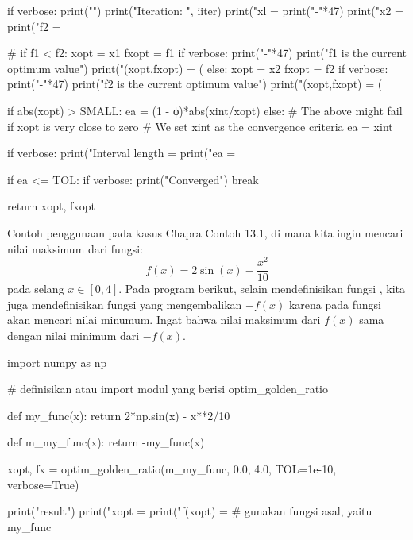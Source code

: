 \begin{pythoncode}
        if verbose:
            print("")
            print("Iteration: ", iiter)
            print("xl = %
            print("-"*47)
            print("x2 = %
            print("f2 = %

        #
        if f1 < f2:
            xopt = x1
            fxopt = f1
            if verbose:
                print("-"*47)
                print("f1 is the current optimum value")
                print("(xopt,fxopt) = (%
        else:
            xopt = x2
            fxopt = f2
            if verbose:
                print("-"*47)
                print("f2 is the current optimum value")
                print("(xopt,fxopt) = (%

        if abs(xopt) > SMALL:
            ea = (1 - ϕ)*abs(xint/xopt)
        else:
            # The above might fail if xopt is very close to zero
            # We set xint as the convergence criteria
            ea = xint

        if verbose:
            print("Interval length = %
            print("ea              = %

        if ea <= TOL:
            if verbose:
                print("Converged")
            break

    return xopt, fxopt
\end{pythoncode}

Contoh penggunaan pada kasus Chapra Contoh 13.1, di mana kita ingin mencari
nilai maksimum dari fungsi:
\begin{equation*}
f(x) = 2\sin(x) - \frac{x^2}{10}
\end{equation*}
pada selang $x \in [0,4]$.
Pada program berikut, selain mendefinisikan fungsi ,
kita juga mendefinisikan fungsi  yang mengembalikan
$-f(x)$ karena pada fungsi  akan
mencari nilai minumum. Ingat bahwa nilai maksimum dari $f(x)$ sama
dengan nilai minimum dari $-f(x)$.

\begin{pythoncode}
import numpy as np

# definisikan atau import modul yang berisi optim_golden_ratio

def my_func(x):
    return 2*np.sin(x) - x**2/10

def m_my_func(x):
    return -my_func(x)

xopt, fx = optim_golden_ratio(m_my_func, 0.0, 4.0, TOL=1e-10, verbose=True)

print("\nOptimization result")
print("xopt    = %
print("f(xopt) = %
# gunakan fungsi asal, yaitu my_func
\end{pythoncode}


